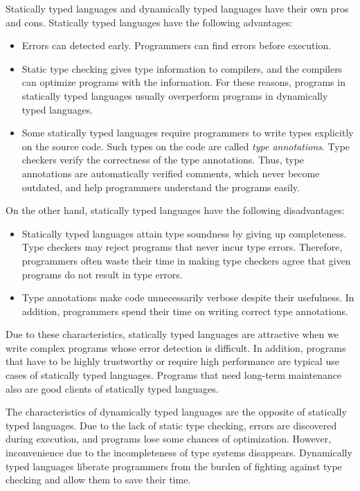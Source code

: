 Statically typed languages and dynamically typed languages have their own pros
and cons. Statically typed languages have the following advantages:
\begin{itemize}
  \item
Errors can detected early. Programmers can find errors before execution.
  \item
    Static type checking
gives type information to compilers, and the compilers can optimize programs
with the information. For these reasons, programs in statically typed languages
usually overperform programs in dynamically typed languages.
  \item
    Some statically typed languages require programmers to write types explicitly
    on the source code. Such types on the code are called \textit{type
    annotations}. Type checkers verify the correctness of
    the type annotations. Thus, type annotations are automatically verified comments, which never
    become outdated, and help programmers understand the programs easily.
\end{itemize}
On the other hand, statically typed languages have the following disadvantages:
\begin{itemize}
  \item
Statically typed languages attain type soundness by giving up completeness.
Type checkers may reject programs that never incur type errors.
Therefore, programmers often waste their time in making type
checkers agree that given programs do not result in type errors.
  \item
Type annotations make code unnecessarily verbose despite their usefulness.
In addition, programmers spend their time on writing correct type annotations.
\end{itemize}

Due to these characteristics, statically typed languages are attractive when we
write complex programs whose error detection is difficult. In addition, programs
that have to be highly trustworthy or require high performance are typical use
cases of statically typed languages. Programs that need long-term maintenance
also are good clients of statically typed languages.

The characteristics of dynamically typed languages are the opposite of
statically typed languages. Due to the lack of static type checking, errors
are discovered during execution, and programs lose some chances of optimization.
However, inconvenience due to the incompleteness of type systems disappears.
Dynamically typed languages liberate programmers from the burden of fighting
against type checking and allow them to save their time.

